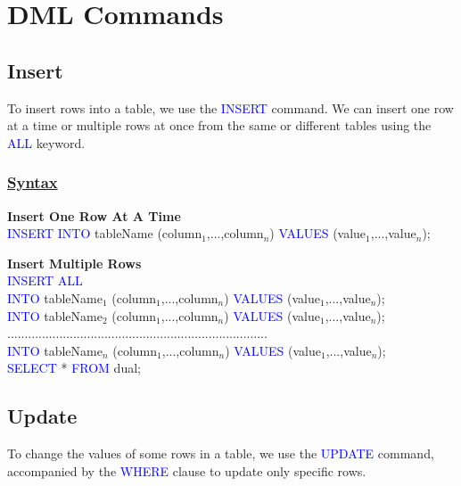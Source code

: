 
\section{DML Commands}

\subsection{Insert}
\begin{tcolorbox}[title = Definition]
To insert rows into a table, we use the \textcolor{blue}{INSERT} command. We can insert one row at a time or multiple rows at once from the same or different tables using the \textcolor{blue}{ALL} keyword.\end{tcolorbox}

\subsubsection*{\underline{\textbf{Syntax}}}
\begin{tcolorbox}[title = Insert]
\textbf{Insert One Row At A Time}\\
\textcolor{blue}{INSERT INTO} tableName (column$_{1}$,...,column$_{n}$) \textcolor{blue}{VALUES} (value$_{1}$,...,value$_{n}$);

\textbf{Insert Multiple Rows}\\
\textcolor{blue}{INSERT ALL}\\
\textcolor{blue}{INTO} tableName$_{1}$ (column$_{1}$,...,column$_{n}$) \textcolor{blue}{VALUES} (value$_{1}$,...,value$_{n}$);\\
\textcolor{blue}{INTO} tableName$_{2}$ (column$_{1}$,...,column$_{n}$) \textcolor{blue}{VALUES} (value$_{1}$,...,value$_{n}$);\\
...........................................................................\\
\textcolor{blue}{INTO} tableName$_{n}$ (column$_{1}$,...,column$_{n}$) \textcolor{blue}{VALUES} (value$_{1}$,...,value$_{n}$);\\
\textcolor{blue}{SELECT} * \textcolor{blue}{FROM} dual;
\end{tcolorbox}

\subsection{Update}
\begin{tcolorbox}[title = Definition]
To change the values of some rows in a table, we use the \textcolor{blue}{UPDATE} command, accompanied by the \textcolor{blue}{WHERE} clause to update only specific rows.
\end{tcolorbox}

